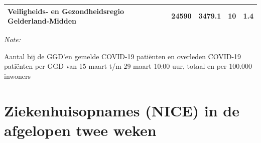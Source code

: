 \documentclass[
  english,
  man,floatsintext]{apa6}
\begin{document}
\begin{table}
\begin{threeparttable}
\begin{tabular}{lrrrr}
Veiligheids- en Gezondheidsregio Gelderland-Midden & 24590 & 3479.1 & 10 & 1.4\\
\bottomrule
\end{tabular}
\begin{tablenotes}
\item \textit{Note: } 
\item Aantal bij de GGD’en gemelde COVID-19 patiënten en overleden COVID-19 patiënten per GGD van 15 maart t/m 29 maart 10:00 uur, totaal en per 100.000 inwoners
\end{tablenotes}
\end{threeparttable}
\endgroup{}
\end{table}

\newpage

\hypertarget{ziekenhuisopnames-nice-in-de-afgelopen-twee-weken}{%
\section{Ziekenhuisopnames (NICE) in de afgelopen twee weken}\label{ziekenhuisopnames-nice-in-de-afgelopen-twee-weken}}
\end{document}
